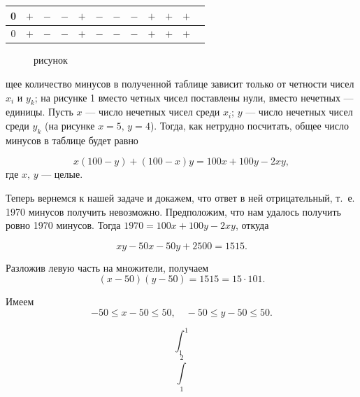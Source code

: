 \begin{table}
\begin{tabular}{|c|c|c|c|c|c|c|c|c|c|c|c|}
\hline
0 & \cellcolor{white!30} $+$ & \cellcolor{blue!30} $-$ & \cellcolor{blue!30} $-$ & \cellcolor{white!30} $+$ & \cellcolor{blue!30} $-$ & \cellcolor{blue!30} $-$ & \cellcolor{blue!30} $-$ & \cellcolor{white!30} $+$ & \cellcolor{white!30} $+$ & \cellcolor{white!30} $+$ \\
\hline
0 & \cellcolor{white!30} $+$ & \cellcolor{blue!30} $-$ & \cellcolor{blue!30} $-$ & \cellcolor{white!30} $+$ & \cellcolor{blue!30} $-$ & \cellcolor{blue!30} $-$ & \cellcolor{blue!30} $-$ & \cellcolor{white!30} $+$ & \cellcolor{white!30} $+$ & \cellcolor{white!30} $+$ \\
\hline
\end{tabular}
\end{table}

\begin{figure}
\caption{рисунок}
\end{figure}

\noindent щее количество минусов в полученной таблице зависит только от четности чисел \( x_i \) и \( y_k \); на рисунке 1 вместо четных чисел поставлены нули, вместо нечетных --- единицы. Пусть \( x \) --- число нечетных чисел среди \( x_i \); \( y \) --- число нечетных чисел среди \( y_k \) (на рисунке \( x = 5, \, y = 4 \)). Тогда, как нетрудно посчитать, общее число минусов в таблице будет равно

\[
x(100 - y) + (100 - x)y = 100x + 100y - 2xy,
\]
где \( x, \, y \) --- целые.

Теперь вернемся к нашей задаче и докажем, что ответ в ней отрицательный, т.~е. 1970 минусов получить невозможно. Предположим, что нам удалось получить ровно 1970 минусов. Тогда \( 1970 = 100x + 100y - 2xy \), откуда

\[
xy - 50x - 50y + 2500 = 1515.
\]

Разложив левую часть на множители, получаем
\[
(x - 50)(y - 50) = 1515 = 15 \cdot 101.
\]

Имеем
\[
-50 \leq x - 50 \leq 50, \quad -50 \leq y - 50 \leq 50.
\]

$$\int_1^1$$ $$\int\limits_1^2$$